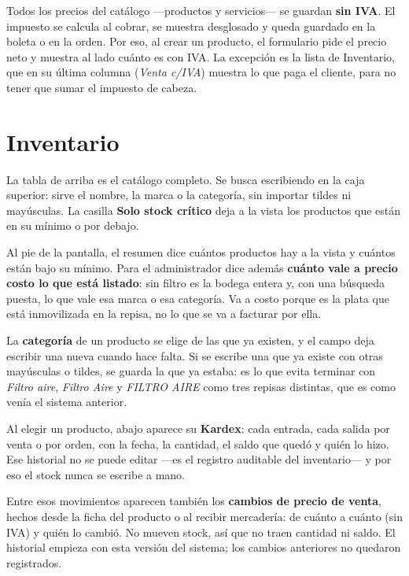 \documentclass[11pt,a4paper]{article}
\begin{document}
Todos los precios del catálogo —productos y servicios— se guardan \textbf{sin
IVA}. El impuesto se calcula al cobrar, se muestra desglosado y queda guardado
en la boleta o en la orden. Por eso, al crear un producto, el formulario pide el
precio neto y muestra al lado cuánto es con IVA. La excepción es la lista de
Inventario, que en su última columna (\emph{Venta c/IVA}) muestra lo que paga
el cliente, para no tener que sumar el impuesto de cabeza.

\section{Inventario}


La tabla de arriba es el catálogo completo. Se busca escribiendo en la caja
superior: sirve el nombre, la marca o la categoría, sin importar tildes ni
mayúsculas. La casilla \textbf{Solo stock crítico} deja a la vista los productos
que están en su mínimo o por debajo.

Al pie de la pantalla, el resumen dice cuántos productos hay a la vista y
cuántos están bajo su mínimo. Para el administrador dice además
\textbf{cuánto vale a precio costo lo que está listado}: sin filtro es la bodega
entera y, con una búsqueda puesta, lo que vale esa marca o esa categoría. Va a
costo porque es la plata que está inmovilizada en la repisa, no lo que se va a
facturar por ella.

La \textbf{categoría} de un producto se elige de las que ya existen, y el
campo deja escribir una nueva cuando hace falta. Si se escribe una que ya
existe con otras mayúsculas o tildes, se guarda la que ya estaba: es lo que
evita terminar con \emph{Filtro aire}, \emph{Filtro Aire} y \emph{FILTRO
AIRE} como tres repisas distintas, que es como venía el sistema anterior.

Al elegir un producto, abajo aparece su \textbf{Kardex}: cada entrada, cada
salida por venta o por orden, con la fecha, la cantidad, el saldo que quedó y
quién lo hizo. Ese historial no se puede editar —es el registro auditable del
inventario— y por eso el stock nunca se escribe a mano.

Entre esos movimientos aparecen también los \textbf{cambios de precio de
venta}, hechos desde la ficha del producto o al recibir mercadería: de cuánto a
cuánto (sin IVA) y quién lo cambió. No mueven stock, así que no traen cantidad
ni saldo. El historial empieza con esta versión del sistema; los cambios
anteriores no quedaron registrados.
\end{document}

